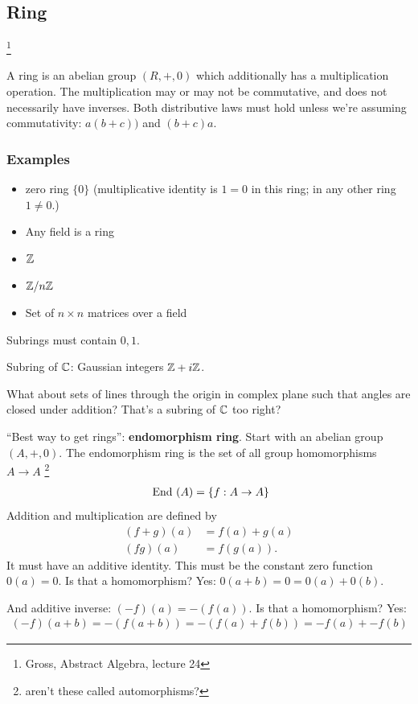 \subsection{Ring}

\footnote{Gross, Abstract Algebra, lecture 24}

A ring is an abelian group $(R, +, 0)$ which additionally has a multiplication
operation. The multiplication may or may not be commutative, and does not
necessarily have inverses. Both distributive laws must hold unless we're
assuming commutativity: $a(b + c))$ and $(b + c)a$.

\subsubsection{Examples}
\begin{itemize}
\item zero ring $\{0\}$ (multiplicative identity is $1 = 0$ in this ring; in
  any other ring $1 \neq 0$.)
\item Any field is a ring
\item $\mathbb{Z}$
\item $\mathbb{Z}/n\mathbb{Z}$
\item Set of $n \times n$ matrices over a field
\end{itemize}

Subrings must contain $0, 1$.

Subring of $\mathbb{C}$: Gaussian integers $\mathbb{Z} + i\mathbb{Z}$.

What about sets of lines through the origin in complex plane such that angles
are closed under addition? That's a subring of $\mathbb{C}$ too right?

``Best way to get rings'': \textbf{endomorphism ring}. Start with an abelian
group $(A, +, 0)$. The endomorphism ring is the set of all group homomorphisms
$A \to A$ \footnote{aren't these called automorphisms?}
\begin{align*}
~\text{End}~(A) = \{f: A \to A\}
\end{align*}
Addition and multiplication are defined by
\begin{align*}
  (f + g)(a) &= f(a) + g(a)\\
  (fg)(a)    &= f(g(a)).
\end{align*}
It must have an additive identity. This must be the constant zero function
$0(a) = 0$. Is that a homomorphism? Yes: $0(a + b) = 0 = 0(a) + 0(b)$.

And additive inverse: $(-f)(a) = -(f(a))$. Is that a homomorphism? Yes:
\begin{align*}
  (-f)(a + b) = -(f(a + b)) = -(f(a) + f(b)) = -f(a) + -f(b)
\end{align*}

